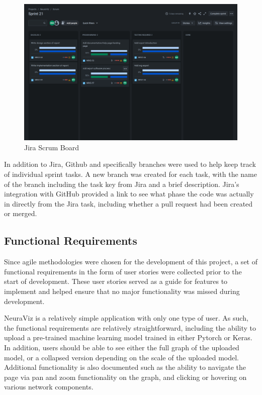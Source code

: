 \begin{figure}[htb]
    \centering
    \includegraphics[width=1\textwidth]{02_dev_process/res/jira_board_sprint_21.png}
    \caption[Jira Scrum Board]{Jira Scrum Board}
    \label{fig:jira_scrum_board}
\end{figure}

In addition to Jira, Github and specifically branches were used to help keep track of individual sprint tasks. A new branch was created for each task, with the name of the branch including the task key from Jira and a brief description. Jira's integration with GitHub provided a link to see what phase the code was actually in directly from the Jira task, including whether a pull request had been created or merged.

\subsection{Functional Requirements}
Since agile methodologies were chosen for the development of this project, a set of functional requirements in the form of user stories were collected prior to the start of development. These user stories served as a guide for features to implement and helped ensure that no major functionality was missed during development.

NeuraViz is a relatively simple application with only one type of user. As such, the functional requirements are relatively straightforward, including the ability to upload a pre-trained machine learning model trained in either Pytorch or Keras. In addition, users should be able to see either the full graph of the uploaded model, or a collapsed version depending on the scale of the uploaded model. Additional functionality is also documented such as the ability to navigate the page via pan and zoom functionality on the graph, and clicking or hovering on various network components. 

